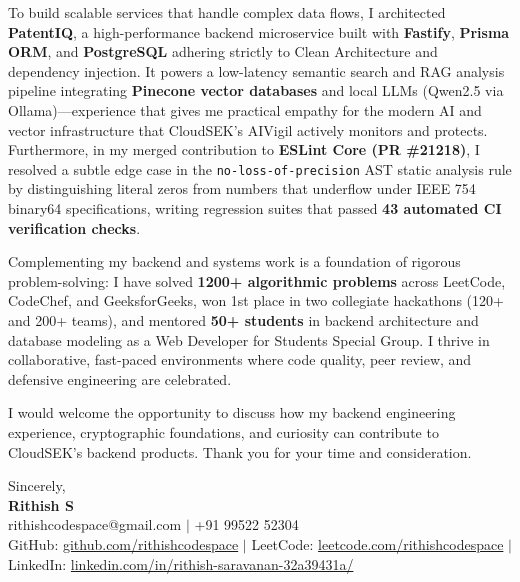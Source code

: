 \documentclass[letterpaper,11pt]{article}
\begin{document}
To build scalable services that handle complex data flows, I architected \textbf{PatentIQ}, a high-performance backend microservice built with \textbf{Fastify}, \textbf{Prisma ORM}, and \textbf{PostgreSQL} adhering strictly to Clean Architecture and dependency injection. It powers a low-latency semantic search and RAG analysis pipeline integrating \textbf{Pinecone vector databases} and local LLMs (Qwen2.5 via Ollama)---experience that gives me practical empathy for the modern AI and vector infrastructure that CloudSEK's AIVigil actively monitors and protects. Furthermore, in my merged contribution to \textbf{ESLint Core (PR \#21218)}, I resolved a subtle edge case in the \texttt{no-loss-of-precision} AST static analysis rule by distinguishing literal zeros from numbers that underflow under IEEE 754 binary64 specifications, writing regression suites that passed \textbf{43 automated CI verification checks}.

Complementing my backend and systems work is a foundation of rigorous problem-solving: I have solved \textbf{1200+ algorithmic problems} across LeetCode, CodeChef, and GeeksforGeeks, won 1st place in two collegiate hackathons (120+ and 200+ teams), and mentored \textbf{50+ students} in backend architecture and database modeling as a Web Developer for Students Special Group. I thrive in collaborative, fast-paced environments where code quality, peer review, and defensive engineering are celebrated.

I would welcome the opportunity to discuss how my backend engineering experience, cryptographic foundations, and curiosity can contribute to CloudSEK's backend products. Thank you for your time and consideration.

\vspace{8pt}
Sincerely, \\ \vspace{2pt}
\textbf{Rithish S} \\
\small
rithishcodespace@gmail.com $|$ +91 99522 52304 \\
GitHub: \href{https://github.com/rithishcodespace}{github.com/rithishcodespace} $|$ LeetCode: \href{https://leetcode.com/rithishcodespace}{leetcode.com/rithishcodespace} $|$ LinkedIn: \href{https://www.linkedin.com/in/rithish-saravanan-32a39431a/}{linkedin.com/in/rithish-saravanan-32a39431a/}
\end{document}
